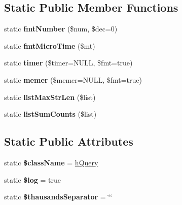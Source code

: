 \subsection*{Static Public Member Functions}
\begin{DoxyCompactItemize}
\item 
\mbox{\label{classTestHQueryStress_a700a4689712ed71e2a87b94c6b61f7ea}} 
static {\bfseries fmt\+Number} (\$num, \$dec=0)
\item 
\mbox{\label{classTestHQueryStress_aafd0d070bf7949347a08cb6d67905c98}} 
static {\bfseries fmt\+Micro\+Time} (\$mt)
\item 
\mbox{\label{classTestHQueryStress_acdb8750c495b276c6cc2bda340389342}} 
static {\bfseries timer} (\$timer=N\+U\+LL, \$fmt=true)
\item 
\mbox{\label{classTestHQueryStress_a1714c683977e51a4bec1bf88b9fcb277}} 
static {\bfseries memer} (\$memer=N\+U\+LL, \$fmt=true)
\item 
\mbox{\label{classTestHQueryStress_a50019e7decf8cf226cdfca23bb318450}} 
static {\bfseries list\+Max\+Str\+Len} (\$list)
\item 
\mbox{\label{classTestHQueryStress_a9f48a42d94797427e9c3f82005b95969}} 
static {\bfseries list\+Sum\+Counts} (\$list)
\end{DoxyCompactItemize}
\subsection*{Static Public Attributes}
\begin{DoxyCompactItemize}
\item 
\mbox{\label{classTestHQueryStress_af2f90a5ffe8a795351913371993f84b4}} 
static {\bfseries \$class\+Name} = \textquotesingle{}\mbox{\hyperlink{classduzun_1_1hQuery}{h\+Query}}\textquotesingle{}
\item 
\mbox{\label{classTestHQueryStress_a79e2761a9f949ab4ccd42802ed77cf24}} 
static {\bfseries \$log} = true
\item 
\mbox{\label{classTestHQueryStress_a2de0a7d0edb655c2a8f0a5d9e59a5e79}} 
static {\bfseries \$thausands\+Separator} = \char`\"{}\textquotesingle{}\char`\"{}
\end{DoxyCompactItemize}



